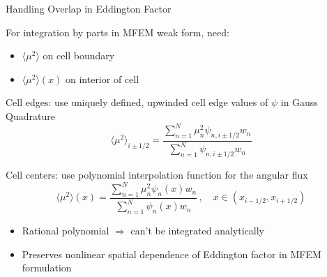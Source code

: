 \documentclass[10pt]{beamer}
\newcommand{\edd}{\langle \mu^2 \rangle}
\begin{document}





% 		


\begin{frame}{Handling Overlap in Eddington Factor}

	For integration by parts in MFEM weak form, need:
	\begin{itemize}
		\item $\edd$ on cell boundary 
		\item $\edd(x)$ on interior of cell 
	\end{itemize}

	Cell edges: use \alert{uniquely defined, upwinded} cell edge values of $\psi$ in Gauss Quadrature 
	\begin{equation*} \label{lldg:edde}
		\edd_{i\pm 1/2} = \frac{
			\sum_{n=1}^N \mu_n^2 \psi_{n,i\pm 1/2} w_n
		}{
			\sum_{n=1}^N \psi_{n,i\pm 1/2} w_n 
		} 
	\end{equation*}

	Cell centers: use polynomial interpolation function for the angular flux 
	\begin{equation*} \label{lldg:eddi}
			\edd(x) = \frac{
				\sum_{n=1}^N \mu_n^2 \psi_{n}(x) w_n
			}{
				\sum_{n=1}^N \psi_{n}(x) w_n 
			} \,, \quad x\in(x_{i-1/2},x_{i+1/2}) 
		\end{equation*}

	\begin{itemize}
		\item Rational polynomial $\Rightarrow$ can't be integrated analytically 

		\item Preserves nonlinear spatial dependence of Eddington factor in MFEM formulation 

	\end{itemize}

\end{frame}
\end{document}
